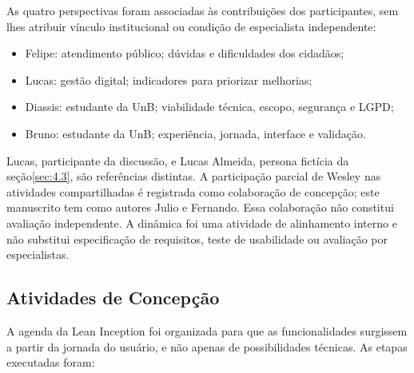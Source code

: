 As quatro perspectivas foram associadas às contribuições dos participantes, sem lhes atribuir vínculo institucional ou condição de especialista independente:

\begin{itemize}
\item
  Felipe: atendimento público; dúvidas e dificuldades dos cidadãos;
\item
  Lucas: gestão digital; indicadores para priorizar melhorias;
\item
  Diassis: estudante da UnB; viabilidade técnica, escopo, segurança e LGPD;
\item
  Bruno: estudante da UnB; experiência, jornada, interface e validação.
\end{itemize}

Lucas, participante da discussão, e Lucas Almeida, persona fictícia da seção\nobreakspace{}\ref{sec:4.3}, são referências distintas. A participação parcial de Wesley nas atividades compartilhadas é registrada como colaboração de concepção; este manuscrito tem como autores Julio e Fernando. Essa colaboração não constitui avaliação independente. A dinâmica foi uma atividade de alinhamento interno e não substitui especificação de requisitos, teste de usabilidade ou avaliação por especialistas.

\subsection{Atividades de Concepção}
\label{sec:3.3.2}

A agenda da Lean Inception foi organizada para que as funcionalidades surgissem a partir da jornada do usuário, e não apenas de possibilidades técnicas. As etapas executadas foram:


